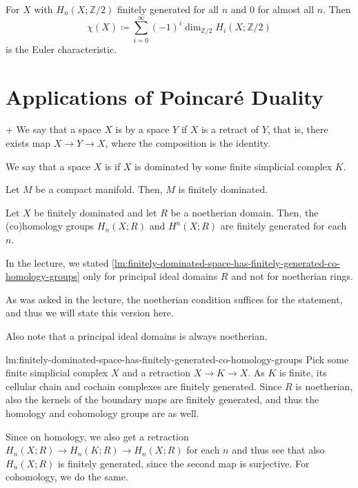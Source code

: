 \begin{definition}
  For $X$ with $H_n(X;\mathbb{Z}/2)$ finitely generated for all $n$
  and  $0$ for almost all $n$.
  Then
   \[
    \chi(X) \coloneqq \sum_{i=0}^{\infty} (-1)^i \dim_{\mathbb{Z}/2} H_i(X;\mathbb{Z}/2)
  \]
  is the Euler characteristic.
\end{definition}


\section{Applications of Poincaré Duality}

\begin{definition}+
  \label{def:finitely-dominated}
  We say that a space $X$ is  by a space $Y$ if  $X$
  is a retract of $Y$, that is, there exists map $X \to Y\to X$,
  where the composition is the identity.

  We say that a space $X$ is  if $X$ is
  dominated by some finite simplicial complex $K$.
\end{definition}

\begin{theorem}
  \label{thm:compact-manifold-is-retract-of-simplicial-complex}
  Let $M$ be a compact manifold.
  Then, $M$ is finitely dominated.
\end{theorem}

\begin{lemma}
  \label{lm:finitely-dominated-space-has-finitely-generated-co-homology-groups}
  Let $X$ be finitely dominated and let $R$ be a noetherian domain.
  Then, the (co)homology groups $H_n(X;R)$ and  $H^n(X;R)$ are finitely
  generated for each $n$.
\end{lemma}

\begin{editor}
  In the lecture, we stated
  \autoref{lm:finitely-dominated-space-has-finitely-generated-co-homology-groups}
  only for principal ideal domains $R$ and not for noetherian rings.

  As was asked in the lecture, the noetherian condition suffices for the
  statement, and thus we will state this version here.

  Also note that a principal ideal domains is always noetherian.
\end{editor}

\begin{refproof}{lm:finitely-dominated-space-has-finitely-generated-co-homology-groups}
  Pick some finite simplicial complex $X$ and a  retraction $X\to K\to X$.
  As $K$ is finite, its cellular chain and cochain complexes are finitely
  generated.
  Since $R$ is noetherian, also the kernels of the boundary maps are finitely
  generated, and thus the homology and cohomology groups are as well.

  Since on homology, we also get a retraction
  $H_n(X;R) \to H_n(K;R) \to H_n(X;R)$ for each $n$ and thus see that also
  $H_n(X;R)$ is finitely generated, since the second map is surjective.
  For cohomology, we do the same.
\end{refproof}

